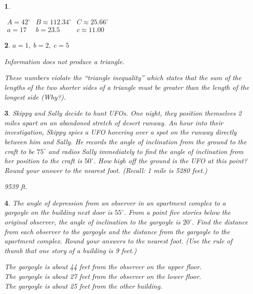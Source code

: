 \documentclass{amsbook}
\newtheorem{exc}{}
\newenvironment{ex}{\begin{exc}\normalfont}{\end{exc}}
\numberwithin{section}{chapter}
\numberwithin{equation}{chapter}
\begin{document}
\begin{multicols}{2}
\begin{ex}
\begin{sol}
	$\begin{array}{lll}
	A = 42^{\circ} & B \approx 112.34^{\circ} & C \approx 25.66^{\circ} \\
	a = 17 & b = 23.5 & c \approx 11.00 \end{array}$
	\end{sol}
\end{ex}


\begin{ex}
	$a = 1, \; b = 2, \; c = 5$
	\begin{sol}
		Information does not produce a triangle.
		
		These numbers violate the ``triangle inequality'' which states that the sum of the lengths of the two shorter sides of a triangle must be greater than the length of the longest side (Why?).
	\end{sol}
\end{ex}
\end{multicols}

\begin{ex}
	 Skippy and Sally decide to hunt UFOs.  One night, they position themselves 2 miles apart on an abandoned stretch of desert runway.  An hour into their investigation, Skippy spies a UFO hovering over a spot on the runway directly between him and Sally.  He records the angle of inclination from the ground to the craft to be $75^{\circ}$ and radios Sally immediately to find the angle of inclination from her position to the craft is $50^{\circ}$.  How high off the ground is the UFO at this point?  Round your answer to the nearest foot.  (Recall:  1 mile is 5280 feet.)
	\begin{sol}
		9539 ft.
	\end{sol}
\end{ex}

\begin{ex}
	 The angle of depression from an observer in an apartment complex to a gargoyle on the building next door is $55^{\circ}$.  From a point five stories below the original observer, the angle of inclination to the gargoyle is $20^{\circ}$.  Find the distance from each observer to the gargoyle and the distance from the gargoyle to the apartment complex.  Round your answers to the nearest foot.  (Use the rule of thumb that one story of a building is 9 feet.)  
	\begin{sol}
		The gargoyle is about 44 feet from the observer on the upper floor. \\
		The gargoyle is about 27 feet from the observer on the lower floor. \\
		The gargoyle is about 25 feet from the other building.
	\end{sol}
\end{ex}
\end{document}
